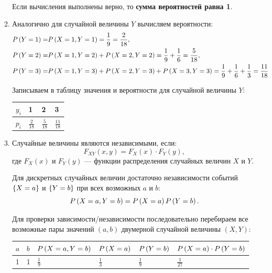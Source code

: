 \documentclass[12pt,a4paper]{article}
\begin{document}
\begin{enumerate}
        Если вычисления выполнены верно, то \textbf{сумма вероятностей равна 1}.

        \item Аналогично для случайной величины $Y$ вычисляем вероятности:
        \begin{align}
            P \left ( Y=1 \right ) = & P \left ( X=1, Y=1 \right ) = \frac{1}{9} = \frac{2}{18} , \\
            P \left ( Y=2 \right ) = & P \left ( X=1, Y=2 \right ) + P \left ( X=2, Y=2 \right ) = \frac{1}{9} + \frac{1}{6} = \frac{5}{18} , \\
            P \left ( Y=3 \right ) = & P \left ( X=1, Y=3 \right ) + P \left ( X=2, Y=3 \right ) + P \left ( X=3, Y=3 \right ) = \frac{1}{9} + \frac{1}{6} + \frac{1}{3} = \frac{11}{18}
        \end{align}

        Записываем в таблицу значения и вероятности для случайной величины $Y$:

        \begin{tabular}{|p{1cm}|p{1cm}|p{1cm}|p{1cm}|}
            \hline
            $y_i$ & 1              & 2              & 3               \\
            \hline
            $p_i$ & $\frac{2}{18}$ & $\frac{5}{18}$ & $\frac{11}{18}$ \\
            \hline
        \end{tabular}

        \item Случайные величины являются независимыми, если:
        \begin{equation}
            F_{XY}(x,y) = F_X(x) \cdot F_Y(y),
        \end{equation}
        где $F_X(x)$ и $F_Y(y)$ --- функции распределения случайных величин $X$ и $Y$.

        Для дискретных случайных величин достаточно независимости событий $\left \{ X=a \right \}$ и $\left \{ Y=b \right \}$ при всех возможных $a$ и $b$:
        \begin{equation}
            P \left ( X=a, Y=b \right ) = P \left ( X=a \right ) P \left ( Y=b \right ).
        \end{equation}

        Для проверки зависимости/независимости последовательно перебираем все возможные пары значений $(a, b)$ двумерной случайной величины $(X, Y)$:

        \begin{tabular}{|p{1cm}|p{1cm}|p{3cm}|p{2cm}|p{2cm}|p{5cm}|}
            \hline
            $a$ & $b$ & $P \left ( X=a, Y=b \right )$ & $P \left ( X=a \right )$ & $P \left ( Y=b \right )$ & $P \left ( X=a \right ) \cdot P \left ( Y=b \right )$ \\
            \hline
            1   & 1   & $\frac{1}{9}$            & $\frac{1}{3}$       & $\frac{1}{9}$       & $\frac{1}{27}$                              \\
            \hline
        \end{tabular}


\end{enumerate}
\end{document}
